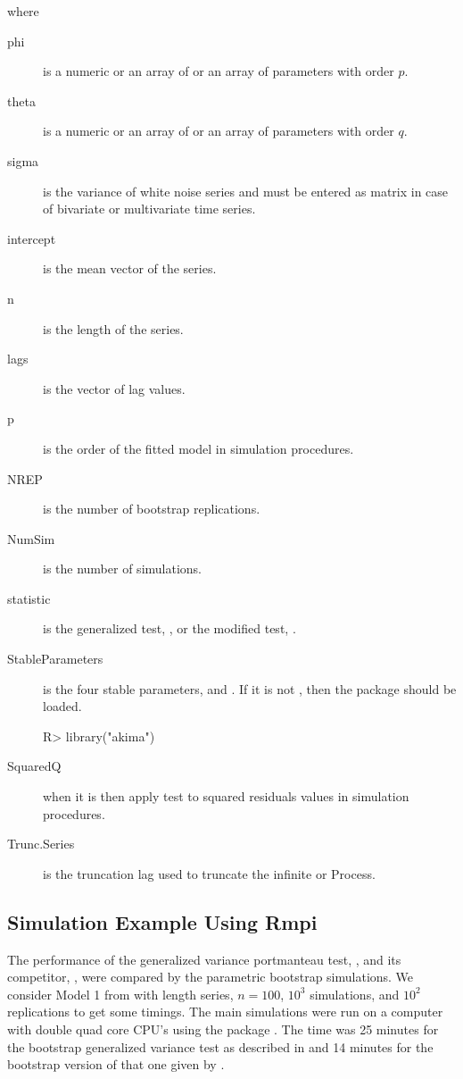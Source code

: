 \documentclass[article,nojss]{jss}
\begin{document}
where
\begin{description}
  \item[phi] is a numeric or an array of  or an array of  parameters with order $p$.
  \item[theta] is a numeric or an array of  or an array of  parameters with order $q$.
  \item[sigma] is the variance of white noise series and must be entered as matrix in case of bivariate or multivariate time series.
  \item[intercept] is the mean vector of the series.
  \item[n] is the length of the series.
  \item[lags] is the vector of lag values.
  \item[p] is the order of the fitted  model in simulation procedures. 
  \item[NREP] is the number of bootstrap replications.
  \item[NumSim] is the number of simulations.
  \item[statistic] is the generalized test, , or the modified test, .  
  \item[StableParameters] is the four stable parameters,  and .  
  If it is not , then the  package  should be loaded.

\begin{Schunk}
\begin{Sinput}
R> library("akima")
 \end{Sinput}
 \end{Schunk}
   
  \item[SquaredQ] when it is  then apply test to squared residuals values in simulation procedures.
  \item[Trunc.Series] is the truncation lag used to truncate the infinite  or  Process.            
\end{description}


\subsection[Simulation Example Using Rmpi]{Simulation Example Using Rmpi}
\label{ExampleRmpi}

The performance of the generalized variance portmanteau test, , and its competitor,
, were compared by the parametric bootstrap simulations.
We consider Model 1 from \cite{MahdiMcLeod2010} with length series, $n=100$,
$10^3$ simulations, and $10^2$ replications to get some timings.
The main simulations were run on a computer with double quad core CPU's using the  package \citep{YuRmpiRnews}.
The time was 25 minutes for the bootstrap generalized variance test as described in \cite{MahdiMcLeod2010} and 14 minutes for 
the bootstrap version of that one given by \citet{LiMcLeod1981}.
\end{document}
